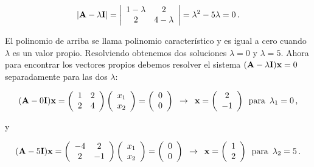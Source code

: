 \documentclass[
]{agujournal2019}
\begin{document}
\[|{\textbf A}-\lambda{\textbf I}|=\left|\begin{array}{ccccc}
  1-\lambda & 2\\
  2 & 4-\lambda\\
        \end{array}\right|=\lambda^2-5\lambda=0\,.\]

\noindent El polinomio de arriba se llama polinomio característico y es
igual a cero cuando \(\lambda\) es un valor propio. Resolviendo
obtenemos dos soluciones \(\lambda=0\) y \(\lambda=5\). Ahora para
encontrar los vectores propios debemos resolver el sistema
\(({\textbf A}-\lambda{\textbf I}){\textbf x}=0\) separadamente para las
dos \(\lambda\):

\[({\textbf A}-0{\textbf I}){\textbf x}=
\left(\begin{array}{ccccc}
  1 & 2\\
  2 & 4\\
      \end{array}\right)
      \left(\begin{array}{c}
  x_1 \\
  x_2 \\
      \end{array}\right)=
      \left(\begin{array}{c}
  0 \\
  0 \\
      \end{array}\right)\,\,\,\rightarrow\,\,\,{\textbf x}=\left(\begin{array}{c}
  2 \\
  -1 \\
      \end{array}\right)\,\,\,{\rm para}\,\,\,\lambda_1=0\,,\]

y

\[({\textbf A}-5{\textbf I}){\textbf x}=
\left(\begin{array}{ccccc}
  -4 & 2\\
  2 & -1\\
      \end{array}\right)
      \left(\begin{array}{c}
  x_1 \\
  x_2 \\
      \end{array}\right)=
      \left(\begin{array}{c}
  0 \\
  0 \\
      \end{array}\right)\,\,\,\rightarrow\,\,\,{\textbf x}=\left(\begin{array}{c}
  1 \\
  2 \\
      \end{array}\right)\,\,\,{\rm para}\,\,\,\lambda_2=5\,.\]
\end{document}
